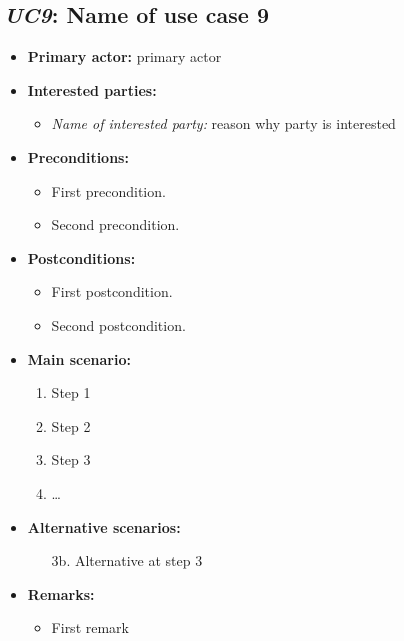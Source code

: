 \documentclass[a4paper,10pt]{article}
\begin{document}
\subsection{\emph{UC9}: Name of use case 9}
\begin{itemize}
    \item \textbf{Primary actor:} primary actor
    \item \textbf{Interested parties:} 
        \begin{itemize}
            \item \textit{Name of interested party:} reason why party is interested
        \end{itemize}

    \item \textbf{Preconditions:}
        \begin{itemize}
            \item First precondition.
            \item Second precondition.
        \end{itemize}

    \item \textbf{Postconditions:}
        \begin{itemize}
            \item First postcondition.
            \item Second postcondition.
        \end{itemize}
        
    \item \textbf{Main scenario:} 
    \begin{enumerate}
       \item Step 1
       \item Step 2
       \item Step 3
       \item \ldots
    \end{enumerate}

    \item \textbf{Alternative scenarios:} 
    \begin{enumerate}
        \item [3b.] Alternative at step 3
    \end{enumerate}
    
    \item \textbf{Remarks:}
        \begin{itemize}
            \item First remark
        \end{itemize}
\end{itemize}
\end{document}
